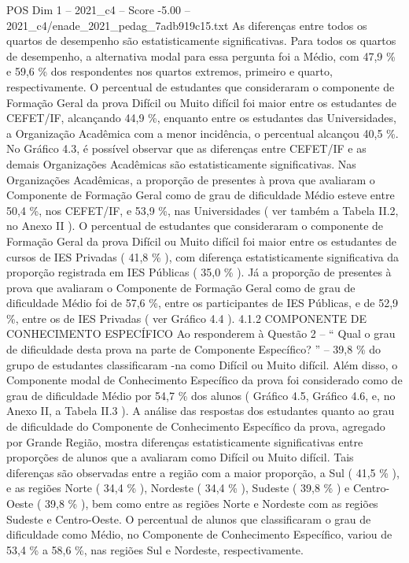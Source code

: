 \begin{textsample}{POS Dim 1 – 2021\_c4 – Score -5.00 – 2021\_c4/enade\_2021\_pedag\_7adb919c15.txt}
As diferenças entre todos os quartos de desempenho são estatisticamente significativas.
Para todos os quartos de desempenho, a alternativa modal para essa pergunta foi a Médio, com 47,9 \% e 59,6 \% dos respondentes nos quartos extremos, primeiro e quarto, respectivamente.
O percentual de estudantes que consideraram o componente de Formação Geral da prova Difícil ou Muito difícil foi maior entre os estudantes de CEFET/IF, alcançando 44,9 \%, enquanto entre os estudantes das Universidades, a Organização Acadêmica com a menor incidência, o percentual alcançou 40,5 \%.
No Gráfico 4.3, é possível observar que as diferenças entre CEFET/IF e as demais Organizações Acadêmicas são estatisticamente significativas.
Nas Organizações Acadêmicas, a proporção de presentes à prova que avaliaram o Componente de Formação Geral como de grau de dificuldade Médio esteve entre 50,4 \%, nos CEFET/IF, e 53,9 \%, nas Universidades ( ver também a Tabela II.2, no Anexo II ).
O percentual de estudantes que consideraram o componente de Formação Geral da prova Difícil ou Muito difícil foi maior entre os estudantes de cursos de IES Privadas ( 41,8 \% ), com diferença estatisticamente significativa da proporção registrada em IES Públicas ( 35,0 \% ).
Já a proporção de presentes à prova que avaliaram o Componente de Formação Geral como de grau de dificuldade Médio foi de 57,6 \%, entre os participantes de IES Públicas, e de 52,9 \%, entre os de IES Privadas ( ver Gráfico 4.4 ). 4.1.2 COMPONENTE DE CONHECIMENTO ESPECÍFICO Ao responderem à Questão 2 – “ Qual o grau de dificuldade desta prova na parte de Componente Específico? ” – 39,8 \% do grupo de estudantes classificaram -na como Difícil ou Muito difícil.
Além disso, o Componente modal de Conhecimento Específico da prova foi considerado como de grau de dificuldade Médio por 54,7 \% dos alunos ( Gráfico 4.5, Gráfico 4.6, e, no Anexo II, a Tabela II.3 ).
A análise das respostas dos estudantes quanto ao grau de dificuldade do Componente de Conhecimento Específico da prova, agregado por Grande Região, mostra diferenças estatisticamente significativas entre proporções de alunos que a avaliaram como Difícil ou Muito difícil.
Tais diferenças são observadas entre a região com a maior proporção, a Sul ( 41,5 \% ), e as regiões Norte ( 34,4 \% ), Nordeste ( 34,4 \% ), Sudeste ( 39,8 \% ) e Centro-Oeste ( 39,8 \% ), bem como entre as regiões Norte e Nordeste com as regiões Sudeste e Centro-Oeste.
O percentual de alunos que classificaram o grau de dificuldade como Médio, no Componente de Conhecimento Específico, variou de 53,4 \% a 58,6 \%, nas regiões Sul e Nordeste, respectivamente.

\end{textsample}

